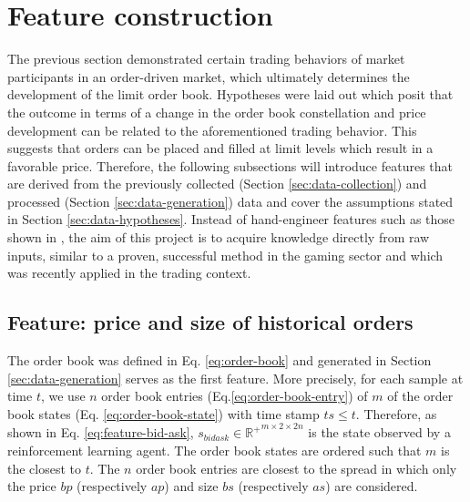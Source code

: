 \section{Feature construction}
\label{sec:feature-engineering}
The previous section demonstrated certain trading behaviors of market participants in an order-driven market, which ultimately determines the development of the limit order book. 
Hypotheses were laid out which posit that the outcome in terms of a change in the order book constellation and price development can be related to the aforementioned trading behavior.
This suggests that orders can be placed and filled at limit levels which result in a favorable price.
Therefore, the following subsections will introduce features that are derived from the previously collected (Section \ref{sec:data-collection}) and processed (Section \ref{sec:data-generation}) data and cover the assumptions stated in Section \ref{sec:data-hypotheses}.
Instead of hand-engineer features such as those shown in \cite{nevmyvaka2006reinforcement, hwangdeep, fletcher2010multiple}, the aim of this project is to acquire knowledge directly from raw inputs, similar to a proven, successful method in the gaming sector\cite{mnih2013playing} and which was recently applied in the trading context\cite{lu2017agent}.

\subsection{Feature: price and size of historical orders}
\label{sec:data-feature-1}
The order book was defined in Eq. \ref{eq:order-book} and generated in Section \ref{sec:data-generation} serves as the first feature.
More precisely, for each sample at time $t$, we use $n$ order book entries (Eq.\ref{eq:order-book-entry}) of $m$ of the order book states (Eq. \ref{eq:order-book-state}) with time stamp $ts \le t$.
Therefore, as shown in Eq. \ref{eq:feature-bid-ask}, $s_{bidask} \in \mathbb{R^+}^{m\times2\times2n}$ is the state observed by a reinforcement learning agent.
The order book states are ordered such that $m$ is the closest to $t$.
The $n$ order book entries are closest to the spread in which only the price $bp$ (respectively $ap$) and size $bs$ (respectively $as$) are considered.

